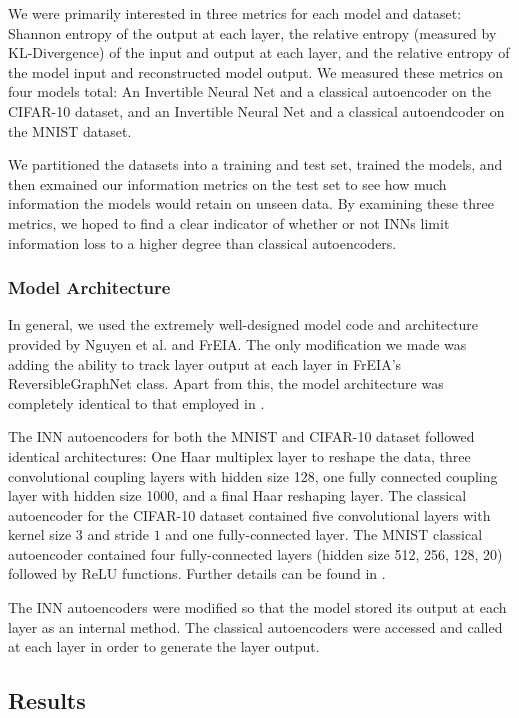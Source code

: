 \documentclass[11pt,letterpaper]{article}
\begin{document}
     We were primarily interested in three metrics for each model and dataset: Shannon entropy of the output at each layer, the relative entropy (measured by KL-Divergence) of the input and output at each layer, and the relative entropy of the model input and reconstructed model output. We measured these metrics on four models total: An Invertible Neural Net and a classical autoencoder on the CIFAR-10 dataset, and an Invertible Neural Net and a classical autoendcoder on the MNIST dataset.

     We partitioned the datasets into a training and test set, trained the models, and then exmained our information metrics on the test set to see how much information the models would retain on unseen data. By examining these three metrics, we hoped to find a clear indicator of whether or not INNs limit information loss to a higher degree than classical autoencoders.

   \subsubsection{Model Architecture}
     In general, we used the extremely well-designed model code and architecture provided by Nguyen et al. and FrEIA. The only modification we made was adding the ability to track layer output at each layer in FrEIA's ReversibleGraphNet class. Apart from this, the model architecture was completely identical to that employed in \cite{Nguyen2019}.

     The INN autoencoders for both the MNIST and CIFAR-10 dataset followed identical architectures: One Haar multiplex layer to reshape the data, three convolutional coupling layers with hidden size 128, one fully connected coupling layer with hidden size 1000, and a final Haar reshaping layer. The classical autoencoder for the CIFAR-10 dataset contained five convolutional layers with kernel size $3$ and stride $1$ and one fully-connected layer. The MNIST classical autoencoder contained four fully-connected layers (hidden size 512, 256, 128, 20) followed by ReLU functions. Further details can be found in \cite{Nguyen2019}.

     The INN autoencoders were modified so that the model stored its output at each layer as an internal method. The classical autoencoders were accessed and called at each layer in order to generate the layer output.

   \subsection{Results}
\end{document}
